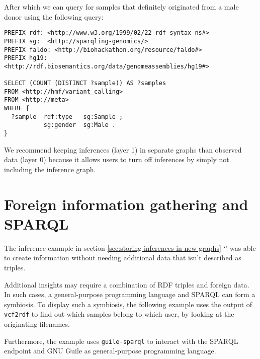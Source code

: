  After which we can query for samples that definitely originated from a male
  donor using the following query:

\begin{siderules}
\begin{verbatim}
PREFIX rdf: <http://www.w3.org/1999/02/22-rdf-syntax-ns#>
PREFIX sg:  <http://sparqling-genomics/>
PREFIX faldo: <http://biohackathon.org/resource/faldo#>
PREFIX hg19:  <http://rdf.biosemantics.org/data/genomeassemblies/hg19#>

SELECT (COUNT (DISTINCT ?sample)) AS ?samples
FROM <http://hmf/variant_calling>
FROM <http://meta>
WHERE {
  ?sample  rdf:type   sg:Sample ;
           sg:gender  sg:Male .
}
\end{verbatim}
\end{siderules}

  We recommend keeping inferences (layer 1) in separate graphs than observed
  data (layer 0) because it allows users to turn off inferences by simply not
  including the inference graph.


\section{Foreign information gathering and SPARQL}

  The inference example in section \ref{sec:storing-inferences-in-new-graphs}
  {\color{LinkGray}`'} was able
  to create information without needing additional data that isn't described
  as triples.

  Additional insights may require a combination of RDF triples and foreign
  data.  In such cases, a general-purpose programming language and SPARQL can
  form a symbiosis.  To display such a symbiosis, the following example uses
  the output of \texttt{vcf2rdf} to find out which samples belong to which
  user, by looking at the originating filenames.

  Furthermore, the example uses \texttt{guile-sparql} to interact with the
  SPARQL endpoint and GNU Guile as general-purpose programming language.

